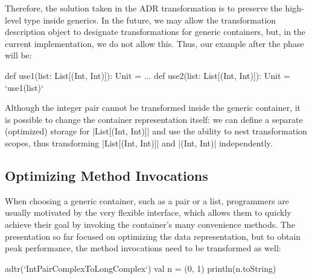 Therefore, the solution taken in the ADR transformation is to preserve the high-level type inside generics. In the future, we may allow the transformation description object to designate transformations for generic containers, but, in the current implementation, we do not allow this. Thus, our example after the \commit{} phase will be:

\begin{lstlisting-nobreak}
def use1(list: List[(Int, Int)]): Unit = ...
def use2(list: List[(Int, Int)]): Unit = `use1(list)`
\end{lstlisting-nobreak}

Although the integer pair cannot be transformed inside the generic container, it is possible to change the container representation itself: we can define a separate (optimized) storage for |List[(Int, Int)]| and use the ability to nest transformation scopes, thus transforming |List[(Int, Int)]| and |(Int, Int)| independently.



\subsection{Optimizing Method Invocations}
\label{sec:ildl:semantics}

When choosing a generic container, such as a pair or a list, programmers are usually motivated by the very flexible interface, which allows them to quickly achieve their goal by invoking the container's many convenience methods. The presentation so far focused on optimizing the data representation, but to obtain peak performance, the method invocations need to be transformed as well:

\begin{lstlisting-nobreak}
adtr(`IntPairComplexToLongComplex`) {
  val n = (0, 1)
  println(n.toString)
}
\end{lstlisting-nobreak}


